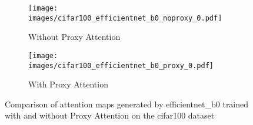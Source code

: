     \begin{figure}[H]
        \centering
        \begin{subfigure}[b]{1\textwidth}
            \texttt{[image: images/cifar100\_efficientnet\_b0\_noproxy\_0.pdf]}
            \caption{Without Proxy Attention}
        \end{subfigure}
        \hfill
        \begin{subfigure}[b]{1\textwidth}
            \texttt{[image: images/cifar100\_efficientnet\_b0\_proxy\_0.pdf]}
            \caption{With Proxy Attention}
        \end{subfigure}
        \caption{Comparison of attention maps generated by efficientnet_b0 trained with and without Proxy Attention on the cifar100 dataset}
    \end{figure}
    
